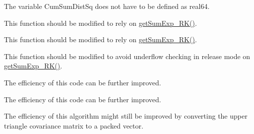 \begin{DoxyRefList}
\label{todo__todo000009}%
%
 The variable {\ttfamily Cum\+Sum\+Dist\+Sq} does not have to be defined as {\ttfamily real64}. 
\item[Subprogram \mbox{\hyperlink{namespaceMath__mod_ae081a3ee17e2f763cf4aefc94c040a6a}{Math\+\_\+mod\+::get\+Log\+Sum\+Exp\+\_\+\+CK}} (Log\+Value, max\+Log\+Value)]\label{todo__todo000011}%
%
 This function should be modified to rely on {\ttfamily \mbox{\hyperlink{namespaceMath__mod_aec8bb7750a5254fcf8d1dd417f99aab9}{get\+Sum\+Exp\+\_\+\+RK()}}}.  
\item[Subprogram \mbox{\hyperlink{namespaceMath__mod_a21698565f7104f71efa6012780a53e48}{Math\+\_\+mod\+::get\+Log\+Sum\+Exp\+\_\+\+RK}} (Log\+Value, max\+Log\+Value)]\label{todo__todo000010}%
%
 This function should be modified to rely on {\ttfamily \mbox{\hyperlink{namespaceMath__mod_aec8bb7750a5254fcf8d1dd417f99aab9}{get\+Sum\+Exp\+\_\+\+RK()}}}.  
\item[Subprogram \mbox{\hyperlink{namespaceMath__mod_aec8bb7750a5254fcf8d1dd417f99aab9}{Math\+\_\+mod\+::get\+Sum\+Exp\+\_\+\+RK}} (Log\+Value, max\+Log\+Value)]\label{todo__todo000012}%
%
 This function should be modified to avoid underflow checking in release mode on {\ttfamily \mbox{\hyperlink{namespaceMath__mod_aec8bb7750a5254fcf8d1dd417f99aab9}{get\+Sum\+Exp\+\_\+\+RK()}}}.  
\item[Subprogram \mbox{\hyperlink{namespaceSample__mod_a1942971b64332fc7c4860112a244764c}{Sample\+\_\+mod\+::get\+Cho\+Low\+Cov\+Upp}} (nd, np, Mean, Sample, Cho\+Low\+Cov\+Upp, Cho\+Dia)]\label{todo__todo000016}%
%
 The efficiency of this code can be further improved.  
\item[Subprogram \mbox{\hyperlink{namespaceSample__mod_a1e5daab49859d9c21c4ec3c916ec963d}{Sample\+\_\+mod\+::get\+Cho\+Low\+Cov\+Upp\+High\+Dim}} (nd, np, Mean, Sample, Cho\+Low\+Cov\+Upp, Cho\+Dia)]\label{todo__todo000017}%
%
 The efficiency of this code can be further improved.  
\item[Subprogram \mbox{\hyperlink{namespaceSample__mod_ab6c8a951bf35c59402a30d6d17a6d193}{Sample\+\_\+mod\+::merge\+Mean\+Cov\+Upp}} (nd, npA, MeanA, Cov\+UppA, npB, MeanB, Cov\+UppB, Mean\+AB, Cov\+Upp\+AB)]\label{todo__todo000018}%
%
 The efficiency of this algorithm might still be improved by converting the upper triangle covariance matrix to a packed vector. 
\item[Subprogram \mbox{\hyperlink{namespaceSample__mod_a81524ddc27a48db65744d80cfad9b348}{Sample\+\_\+mod\+::merge\+Mean\+Cov\+Upp\+Dense}} (nd, npA, MeanA, Cov\+UppA, npB, MeanB, Cov\+UppB)]\label{todo__todo000019}%

\end{DoxyRefList}
